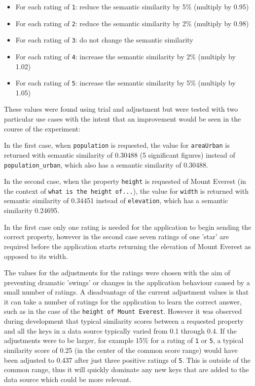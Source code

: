 \documentclass[authoryearcitations]{UoYCSproject}
\begin{document}
\begin{itemize}
  \item For each rating of \texttt{1}: reduce the semantic similarity by 5\% (multiply by 0.95)
  \item For each rating of \texttt{2}: reduce the semantic similarity by 2\% (multiply by 0.98)
  \item For each rating of \texttt{3}: do not change the semantic similarity
  \item For each rating of \texttt{4}: increase the semantic similarity by 2\% (multiply by 1.02)
  \item For each rating of \texttt{5}: increase the semantic similarity by 5\% (multiply by 1.05)  
\end{itemize}

These values were found using trial and adjustment but were tested with two particular use cases with the intent that an improvement would be seen in the course of the experiment: 

In the first case, when \texttt{population} is requested, the value for \texttt{areaUrban} is returned with semantic similarity of 0.30488 (5 significant figures) instead of \texttt{population\_urban}, which also has a semantic similarity of 0.30488.

In the second case, when the property \texttt{height} is requested of Mount Everest (in the context of \texttt{what is the height of...}), the value for \texttt{width} is returned with semantic similarity of 0.34451 instead of \texttt{elevation}, which has a semantic similarity 0.24695.

In the first case only one rating is needed for the application to begin sending the correct property, however in the second case seven ratings of one 'star' are required before the application starts returning the elevation of Mount Everest as opposed to its width.

The values for the adjustments for the ratings were chosen with the aim of preventing dramatic 'swings' or changes in the application behaviour caused by a small number of ratings. A disadvantage of the current adjustment values is that it can take a number of ratings for the application to learn the correct answer, such as in the case of the \texttt{height of Mount Everest}. However it was observed during development that typical similarity scores between a requested property and all the keys in a data source typically varied from 0.1 through 0.4.  If the adjustments were to be larger, for example 15\% for a rating of \texttt{1} or \texttt{5}, a typical similarity score of 0.25 (in the center of the common score range) would have been adjusted to 0.437 after just three positive ratings of \texttt{5}. This is outside of the common range, thus it will quickly dominate any new keys that are added to the data source which could be more relevant. 
\end{document}
